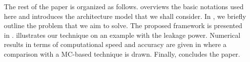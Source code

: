 The rest of the paper is organized as follows.  overviews the basic notations used here and introduces the architecture model that we shall consider. In , we briefly outline the problem that we aim to solve. The proposed framework is presented in .  illustrates our technique on an example with the leakage power. Numerical results in terms of computational speed and accuracy are given in  where a comparison with a MC-based technique is drawn. Finally,  concludes the paper.
